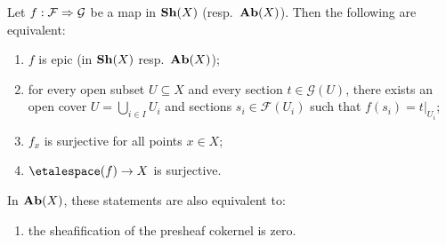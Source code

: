 \begin{lem}\label{lem:epimorphisms-sheaves}
Let \(f\colon\mathcal F\To\mathcal G\) be a map in \(\operatorname{\mathbf{Sh}}(X)\) (resp.~\(\operatorname{\mathbf{Ab}}(X)\)).
Then the following are equivalent:
\begin{enumerate}
\item\label{lem:epimorphisms-sheaves:epic-sheaves} \(f\) is epic (in \(\operatorname{\mathbf{Sh}}(X)\) resp.~\(\operatorname{\mathbf{Ab}}(X)\));
\item\label{lem:epimorphisms-sheaves:locally-lift-section} for every open subset \(U\subseteq X\) and every section \(t\in\mathcal G(U)\), there exists an open cover \(U=\bigcup_{i\in I}U_i\) and sections \(s_i\in\mathcal F(U_i)\) such that \(f(s_i) = t|_{U_i}\);
\item\label{lem:epimorphisms-sheaves:surjective-stalk} \(f_x\) is surjective for all points \(x\in X\);
\item\label{lem:epimorphisms-sheaves:surjective-etale-space} \(\etalespace(f)\to X\) is surjective.
\end{enumerate}
In \(\operatorname{\mathbf{Ab}}(X)\), these statements are also equivalent to:
\begin{enumerate}[resume]
\item\label{lem:epimorphisms-sheaves:surjective-etale-space} the sheafification of the presheaf cokernel is zero.
\end{enumerate}
\end{lem}
